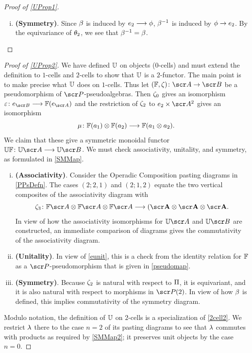 \documentclass{amsart}
\theoremstyle{definition}
\numberwithin{equation}{section}
\begin{document}
\begin{proof} [Proof of \autoref{UProp1}]
\begin{enumerate}[(i)]
\item \textbf{(Symmetry)}. Since $\beta$ is induced by $e_2 \longrightarrow \phi$, $\beta^{-1}$ is induced by $\phi \to e_2$.  By the equivariance of $\theta_2$, we see that $\beta^{-1} = \beta$. 
\end{enumerate}
\end{proof}

\begin{proof}[Proof of \autoref{UProp2}] We have defined $\mathbb{U}$ on objects ($0$-cells) and must extend the definition to $1$-cells and $2$-cells to show that $\mathbb{U}$ is a $2$-functor.  The main point is to make precise what $\mathbb{U}$ does on $1$-cells.  Thus let $(\bF,\ze)\colon \sA\rightarrow \sB$ be a pseudomorphism of $\sP$-pseudoalgebras.   Then $\zeta_0$ gives an isomorphism $\epz\colon e_{\sB}\rtarr \bF(e_{\sA})$ and the restriction of $\zeta_2$ to $e_2\times \sA^2$ gives an isomorphism  
$$\mu\colon \mathbb{F}(a_1)\otimes \mathbb{F}(a_2)\longrightarrow  \mathbb{F}(a_1\otimes a_2).$$
We claim that these give a symmetric monoidal functor $\bU\bF\colon \bU\sA \rtarr \bU\sB$.  We must check associativity, unitality, and symmetry, as formulated in \autoref{SMMap}.

\begin{enumerate}[(i)]
    \item \textbf{(Associativity)}. Consider the Operadic Composition pasting diagrams in \autoref{PPsDefn}. The cases $(2;2,1)$ and $(2;1,2)$ equate the two vertical composites of the associativity diagram with
    $$\ze_3\colon \bF\sA\otimes \bF\sA \otimes \bF\sA \rtarr \bf(\sA\otimes \sA \otimes \sA.$$
 In view of how the associativity isomorphisms for $\bU\sA$ and $\bU\sB$ are constructed, an immediate comparison of diagrams gives the commutativity of the associativity diagram.
\item \textbf{(Unitality)}.  In view of \autoref{eunit}, this is a check from the identity relation for $\mathbb{F}$ as a $\sP$-pseudomorphism that is given in \autoref{pseudomap}. 
\item \textbf{(Symmetry)}.   Because $\zeta_2$ is natural with respect to $\Pi$, it is equivariant, and it is also natural with respect to morphisms in $\sP(2)$.  In view of how $\beta$ is defined, this implies commutativity of the symmetry diagram.
\end{enumerate} 
Modulo notation, the definition of $\mathbb{U}$ on $2$-cells is a specialization of \autoref{2cell2}.  We restrict $\lambda$ there to the case $n=2$ of its pasting diagrams to see that $\lambda$ commutes with products as required by
\autoref{SMMap2};  it preserves unit objects by the case $n=0$.
\end{proof}
\end{document}
